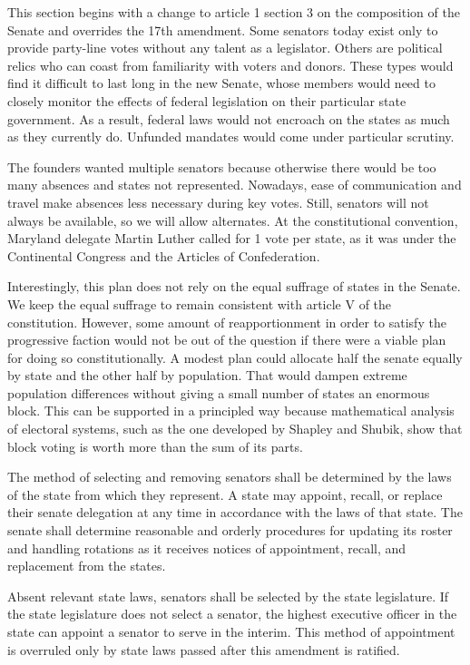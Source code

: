 \documentclass{article}
\begin{document}
This section begins with a change to article 1 section 3 on the composition of the Senate and overrides the 17th amendment. Some senators today exist only to provide party-line votes without any talent as a legislator. Others are political relics who can coast from familiarity with voters and donors. These types would find it difficult to last long in the new Senate, whose members would need to closely monitor the effects of federal legislation on their particular state government. As a result, federal laws would not encroach on the states as much as they currently do. Unfunded mandates would come under particular scrutiny.

The founders wanted multiple senators because otherwise there would be too many absences and states not represented. Nowadays, ease of communication and travel make absences less necessary during key votes. Still, senators will not always be available, so we will allow alternates. At the constitutional convention, Maryland delegate Martin Luther called for 1 vote per state, as it was under the Continental Congress and the Articles of Confederation\cite{Senate}.

Interestingly, this plan does not rely on the equal suffrage of states in the Senate. We keep the equal suffrage to remain consistent with article V of the constitution. However, some amount of reapportionment in order to satisfy the progressive faction would not be out of the question if there were a viable plan for doing so constitutionally\cite{Amar}. A modest plan could allocate half the senate equally by state and the other half by population. That would dampen extreme population differences without giving a small number of states an enormous block. This can be supported in a principled way because mathematical analysis of electoral systems, such as the one developed by Shapley and Shubik\cite{Shapley}, show that block voting is worth more than the sum of its parts\cite{Gross}.

\begin{quoting}
The method of selecting and removing senators shall be determined by the laws of the state from which they represent. A state may appoint, recall, or replace their senate delegation at any time in accordance with the laws of that state. The senate shall determine reasonable and orderly procedures for updating its roster and handling rotations as it receives notices of appointment, recall, and replacement from the states.

Absent relevant state laws, senators shall be selected by the state legislature. If the state legislature does not select a senator, the highest executive officer in the state can appoint a senator to serve in the interim. This method of appointment is overruled only by state laws passed after this amendment is ratified.
\end{quoting}
\end{document}
